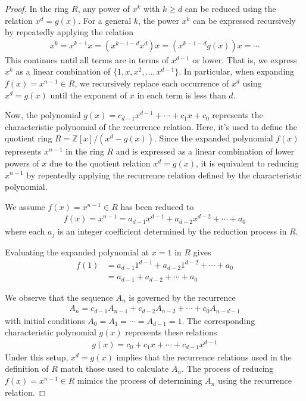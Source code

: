 \documentclass[11pt,reqno]{article}
\theoremstyle{plain}
\theoremstyle{definition}
\begin{document}
\begin{proof}
In the ring $R$, any power of $x^k$ with $k \geq d$ can be reduced using the relation $x^d = g(x)$. For a general $k$, the power $x^k$ can be expressed recursively by repeatedly applying the relation
\begin{align*}
x^k = x^{k-1} x = (x^{k-1-d} x^d) x = (x^{k-1-d} g(x)) x = \cdots
\end{align*}
This continues until all terms are in terms of $x^{d-1}$ or lower. That is, we express $x^k$ as a linear combination of $\{1, x, x^2, \ldots, x^{d-1}\}$. In particular, when expanding $f(x) = x^{n-1} \in R$, we recursively replace each occurrence of $x^d$ using $x^d = g(x)$ until the exponent of $x$ in each term is less than $d$.

Now, the polynomial $g(x) = c_{d-1} x^{d-1} + \cdots + c_1 x + c_0$ represents the characteristic polynomial of the recurrence relation. Here, it's used to define the quotient ring $R = \mathbb{Z}[x]/(x^d - g(x))$. Since the expanded polynomial $f(x)$ represents $x^{n-1}$ in the ring $R$ and is expressed as a linear combination of lower powers of $x$ due to the quotient relation $x^d = g(x)$, it is equivalent to reducing $x^{n-1}$ by repeatedly applying the recurrence relation defined by the characteristic polynomial.

We assume $f(x) = x^{n-1} \in R$ has been reduced to
\begin{align*}
f(x) = x^{n-1} = a_{d-1} x^{d-1} + a_{d-2} x^{d-2} + \cdots + a_0 
\end{align*}
where each $a_j$ is an integer coefficient determined by the reduction process in $R$.

Evaluating the expanded polynomial at $x=1$ in $R$ gives
\begin{align*}
f(1) &= a_{d-1} 1^{d-1} + a_{d-2} 1^{d-2} + \cdots + a_0 \\
&= a_{d-1} + a_{d-2}+ \cdots + a_0
\end{align*}

We observe that the sequence $A_n$ is governed by the recurrence
\begin{align*}
A_{n} = c_{d-1} A_{n-1} + c_{d-2} A_{n-2} + \cdots + c_{0} A_{n-d-1}
\end{align*}
with initial conditions $A_0 = A_1 = \cdots = A_{d-1} = 1$. The corresponding characteristic polynomial $g(x)$ represents these relations
\begin{align*}
g(x) = c_0 + c_1 x + \cdots + c_{d-1} x^{d-1}
\end{align*}
Under this setup, $x^d = g(x)$ implies that the recurrence relations used in the definition of $R$ match those used to calculate $A_n$. The process of reducing $f(x) = x^{n-1} \in R$ mimics the process of determining $A_n$ using the recurrence relation.


\end{proof}
\end{document}
